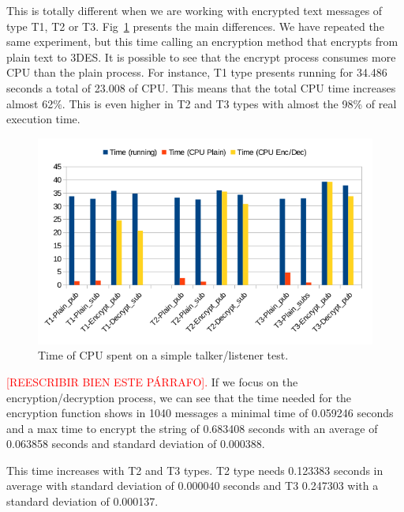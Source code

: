 \documentclass[journal,twoside]{JoPhA}
\begin{document}
This is totally different when we are working with encrypted text messages of type T1, T2 or T3. Fig~\ref{fig:time_text_CPU} presents the main differences. We have repeated the same experiment, but this time calling an encryption method that encrypts from plain text to 3DES. It is possible to see that the encrypt process consumes more CPU than  the plain process.
For instance, T1 type presents running for 34.486 seconds a total of 23.008 of CPU. This means that the total CPU time increases almost 62\%. This is even higher in T2 and T3 types with almost the 98\% of real execution time.
\begin{figure}[ht!]
    \centering
    \includegraphics[width=.5\textwidth]{Text_plain_vs_encrypted.png}
    \caption{Time of CPU spent on a simple talker/listener test.}
  \label{fig:time_text_CPU}
\end{figure}

\textcolor{red}{[REESCRIBIR BIEN ESTE P\'ARRAFO].} If we focus on the encryption/decryption process, we can see that the time needed for the encryption function shows in 1040 messages a minimal time of 0.059246 seconds and a max time to encrypt the string of 0.683408 seconds with an average of 0.063858 seconds and standard deviation of 0.000388.

This time increases with T2 and T3 types. T2 type needs 0.123383 seconds in average with standard deviation of 0.000040 seconds and  T3  0.247303 with a standard deviation of 0.000137.



\end{document}

